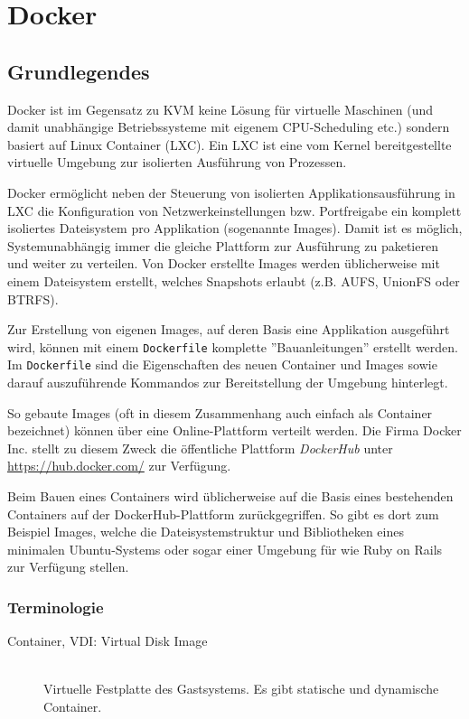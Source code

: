 \section{Docker}
\subsection{Grundlegendes}
Docker ist im Gegensatz zu KVM keine Lösung für virtuelle Maschinen (und damit unabhängige Betriebssysteme mit eigenem CPU-Scheduling etc.) sondern basiert auf Linux Container (LXC). Ein LXC ist eine vom Kernel bereitgestellte virtuelle Umgebung zur isolierten Ausführung von Prozessen.

Docker ermöglicht neben der Steuerung von isolierten Applikationsausführung in LXC die Konfiguration von Netzwerkeinstellungen bzw. Portfreigabe ein komplett isoliertes Dateisystem pro Applikation (sogenannte Images). Damit ist es möglich, Systemunabhängig immer die gleiche Plattform zur Ausführung zu paketieren und weiter zu verteilen. Von Docker erstellte Images werden üblicherweise mit einem Dateisystem erstellt, welches Snapshots erlaubt (z.B. AUFS, UnionFS oder BTRFS).

Zur Erstellung von eigenen Images, auf deren Basis eine Applikation ausgeführt wird, können mit einem \lstinline[]|Dockerfile| komplette ''Bauanleitungen'' erstellt werden. Im \lstinline[]|Dockerfile| sind die Eigenschaften des neuen Container und Images sowie darauf auszuführende Kommandos zur Bereitstellung der Umgebung hinterlegt.

So gebaute Images (oft in diesem Zusammenhang auch einfach als Container bezeichnet) können über eine Online-Plattform verteilt werden. Die Firma Docker Inc. stellt zu diesem Zweck die öffentliche Plattform \emph{DockerHub} unter \url{https://hub.docker.com/} zur Verfügung.

Beim Bauen eines Containers wird üblicherweise auf die Basis eines bestehenden Containers auf der DockerHub-Plattform zurückgegriffen. So gibt es dort zum Beispiel Images, welche die Dateisystemstruktur und Bibliotheken eines minimalen Ubuntu-Systems oder sogar einer Umgebung für  wie Ruby on Rails zur Verfügung stellen.


\subsubsection{Terminologie}
\begin{description}
	\item[Container, VDI: Virtual Disk Image] \hfill \\
	Virtuelle Festplatte des Gastsystems. Es gibt statische und dynamische Container.
\end{description}


